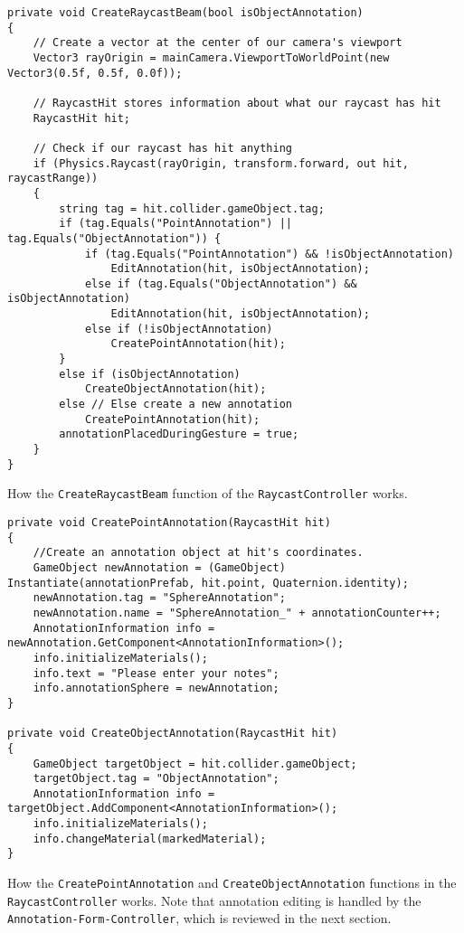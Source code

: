 \begin{table}
\label{table:create_raycast}
\lstset{style=csharp}
\begin{lstlisting}
private void CreateRaycastBeam(bool isObjectAnnotation)
{
    // Create a vector at the center of our camera's viewport
    Vector3 rayOrigin = mainCamera.ViewportToWorldPoint(new Vector3(0.5f, 0.5f, 0.0f));

    // RaycastHit stores information about what our raycast has hit
    RaycastHit hit;

    // Check if our raycast has hit anything
    if (Physics.Raycast(rayOrigin, transform.forward, out hit, raycastRange))
    {
        string tag = hit.collider.gameObject.tag;    
        if (tag.Equals("PointAnnotation") || tag.Equals("ObjectAnnotation")) {
            if (tag.Equals("PointAnnotation") && !isObjectAnnotation)
                EditAnnotation(hit, isObjectAnnotation);
            else if (tag.Equals("ObjectAnnotation") && isObjectAnnotation)
                EditAnnotation(hit, isObjectAnnotation);
            else if (!isObjectAnnotation)
                CreatePointAnnotation(hit);
        }
        else if (isObjectAnnotation)
            CreateObjectAnnotation(hit);
        else // Else create a new annotation
            CreatePointAnnotation(hit);
        annotationPlacedDuringGesture = true;
    }
} 
\end{lstlisting}
\caption[How the \texttt{CreateRaycastBeam} function of the \texttt{Raycast\-Controller} works.]{How the \texttt{Create\-Raycast\-Beam} function of the 
\texttt{Raycast\-Controller} works.} 
\end{table}


\begin{table}
\label{table:create_annotations}
\lstset{style=csharp}
\begin{lstlisting}
private void CreatePointAnnotation(RaycastHit hit)
{
    //Create an annotation object at hit's coordinates. 
    GameObject newAnnotation = (GameObject) Instantiate(annotationPrefab, hit.point, Quaternion.identity);
    newAnnotation.tag = "SphereAnnotation";
    newAnnotation.name = "SphereAnnotation_" + annotationCounter++;
    AnnotationInformation info = newAnnotation.GetComponent<AnnotationInformation>();
    info.initializeMaterials();
    info.text = "Please enter your notes";
    info.annotationSphere = newAnnotation;
}

private void CreateObjectAnnotation(RaycastHit hit)
{
    GameObject targetObject = hit.collider.gameObject;
    targetObject.tag = "ObjectAnnotation";
    AnnotationInformation info = targetObject.AddComponent<AnnotationInformation>();
    info.initializeMaterials();
    info.changeMaterial(markedMaterial);
}
\end{lstlisting}
\caption[How the \texttt{Create\-Point\-Annotation} and \texttt{Create\-Object\-Annotation} functions in the \texttt{Raycast\-Controller} works.]
{How the \texttt{Create\-Point\-Annotation} and \texttt{Create\-Object\-Annotation} functions in the \texttt{Raycast\-Controller} works.
Note that annotation editing is handled by the \texttt{Annotation-Form-Controller}, which is reviewed in the next section.}
\end{table}


